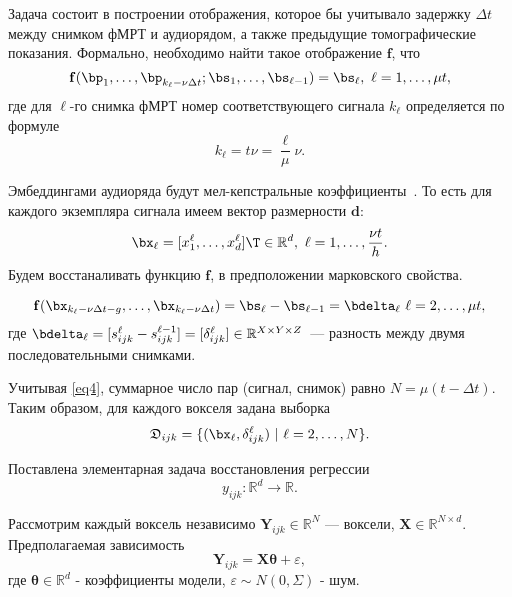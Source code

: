 \documentclass[12pt, twoside]{article}
\begin{document}
Задача состоит в 
построении отображения, которое бы учитывало задержку $\Delta t$ между
снимком фМРТ и аудиорядом, а также предыдущие томографические показания. Формально, необходимо
найти такое отображение $\mathbf{f}$, что
\begin{equation}
	\label{eq3}
	\mathbf{f}(\bp_1, \ldots, \bp_{k_{\ell} - \nu \Delta t}; \bs_1, \ldots, \bs_{\ell-1}) = \bs_{\ell},
	\ \ell = 1, \ldots, \mu t,
\end{equation}
где для $\ell$-го снимка фМРТ номер соответствующего сигнала $k_{\ell}$ определяется по формуле
\begin{equation}
	\label{eq4}
	k_{\ell} = t\nu = \dfrac{\ell}{\mu}\nu.
\end{equation}

Эмбеддингами аудиоряда будут мел-кепстральные коэффициенты~\citep{mfcc}. То есть
для каждого экземпляра сигнала имеем вектор размерности $\mathbf{d}$:
\begin{equation}
	\label{eq5}
 \bx_{\ell} = [x^{\ell}_1, \ldots, x^{\ell}_{d}]\T \in \mathbb{R}^{d}, \ {\ell} = 1, \ldots, \dfrac{\nu t}{h}. 
\end{equation}
Будем восстаналивать функцию $\mathbf{f}$, в предположении марковского свойства. 

\begin{equation}
	\label{eq6}
	\mathbf{f}(\bx_{k_\ell - 
 \nu\Delta t - g}, \ldots, \bx_{k_\ell - 
 \nu\Delta t}) = \bs_\ell - \bs_{\ell-1} = \bdelta_\ell
	\ \ell = 2, \ldots, \mu t,
\end{equation}
где $\bdelta_{\ell} = [s^{\ell}_{ijk} - s^{\ell-1}_{ijk}] = [\delta^{\ell}_{ijk}] \in \mathbb{R}^{X \times Y \times Z}$~--- разность между двумя последовательными снимками.


Учитывая \eqref{eq4}, суммарное число пар (сигнал, снимок)
равно $N = \mu (t - \Delta t)$. Таким образом, для каждого вокселя задана выборка
\[ \mathfrak{D}_{ijk} = \{(\bx_{\ell}, \delta^{\ell}_{ijk}) \ | \ {\ell} = 2, \ldots, N \}. \]

Поставлена элементарная задача восстановления регрессии
\begin{equation}
	\label{eq7}
	y_{ijk}: \mathbb{R}^{d} \to \mathbb{R}.
\end{equation}

Рассмотрим каждый воксель независимо $\mathbf{Y}_{ijk} \in \mathbb{R}^{N}$ --- воксели, $\mathbf{X} \in \mathbb{R}^{N \times d}$. Предполагаемая зависимость
\begin{equation}
	\label{eq8}
	\mathbf{Y}_{ijk} = \mathbf{X}\mathbf{\theta} + \varepsilon,
\end{equation}
где $\mathbf{\theta} \in \mathbb{R}^d$ - коэффициенты модели, $\varepsilon \sim N(0, \Sigma)$ - шум.
\end{document}
